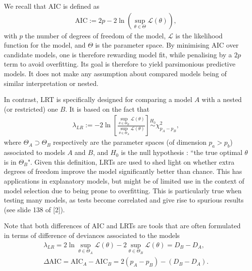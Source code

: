 \documentclass[a4paper, 12pt,oneside]{article}
\begin{document}
				We recall that AIC is defined as 
				\begin{gather}
					\text{AIC}:=2p-2\ln\left(\sup_{\theta\in\Theta}\mathcal{L(\theta)}\right),
				\end{gather}
				with $p$ the number of degrees of freedom of the model, $\mathcal L$ is the likelihood function for the model, and $\Theta$ is the parameter space. By minimising AIC over candidate models, one is therefore rewarding model fit, while penalising by a $2p$ term to avoid overfitting. Its goal is therefore to yield parsimonious predictive models. It does not make any assumption about compared models being of similar interpretation or nested. 

				In contrast, LRT is specifically designed for comparing a model $A$ with a nested (or restricted) one $B$. It is based on the fact that 
				\begin{gather}
					\lambda_{LR}:=-2\ln\left[\frac{\sup_{\theta\in\Theta_B}\mathcal{L(\theta)}}{\sup_{\theta\in\Theta_A}\mathcal{L(\theta)}}\right]
					\overset{H_0}{\sim} \chi^2_{p_A-p_B},
				\end{gather}
				where $\Theta_A\supset\Theta_B$ respectively are the parameter spaces (of dimension $p_a>p_b$) associated to models $A$ and $B$, and $H_0$ is the null hypothesis : ``the true optimal $\theta$ is in $\Theta_B$". Given this definition, LRTs are used to shed light on whether extra degrees of freedom improve the model significantly better than chance. This has applications in explanatory models, but might be of limited use in the context of model selection due to being prone to overfitting. This is particularly true when testing many models, as tests become correlated and give rise to spurious results (see slide 138 of [2]).

				Note that both differences of AIC and LRTs are tools that are often formulated in terms of difference of deviances associated to the models
				\begin{gather}
					\lambda_{LR} = 2\ln \sup_{\theta\in\Theta_A}\mathcal{L(\theta)} - 2 \sup_{\theta\in\Theta_B}\mathcal{L(\theta)} = D_B-D_A,\\
					\Delta \text{AIC} = \text{AIC}_A - \text{AIC}_B = 2(p_A-p_B) - (D_B-D_A). 
				\end{gather}
\end{document}
